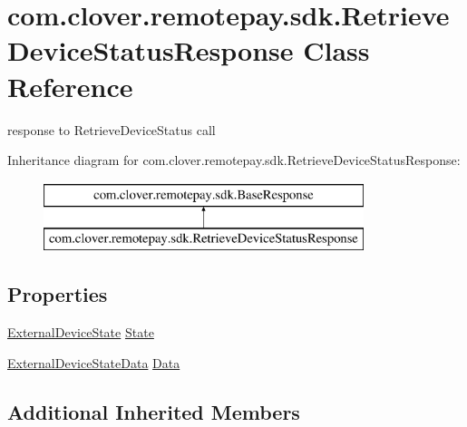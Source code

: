 \hypertarget{classcom_1_1clover_1_1remotepay_1_1sdk_1_1_retrieve_device_status_response}{}\section{com.\+clover.\+remotepay.\+sdk.\+Retrieve\+Device\+Status\+Response Class Reference}
\label{classcom_1_1clover_1_1remotepay_1_1sdk_1_1_retrieve_device_status_response}


response to Retrieve\+Device\+Status call  


Inheritance diagram for com.\+clover.\+remotepay.\+sdk.\+Retrieve\+Device\+Status\+Response\+:\begin{figure}[H]
\begin{center}
\leavevmode
\includegraphics[height=2.000000cm]{classcom_1_1clover_1_1remotepay_1_1sdk_1_1_retrieve_device_status_response}
\end{center}
\end{figure}
\subsection*{Properties}
\begin{DoxyCompactItemize}
\item 
\hyperlink{namespacecom_1_1clover_1_1remotepay_1_1sdk_a9d5838a91e2711306ad561d104fed034}{External\+Device\+State} \hyperlink{classcom_1_1clover_1_1remotepay_1_1sdk_1_1_retrieve_device_status_response_a9e4bc4a0a7fa8c32d6201d6749589212}{State}
\item 
\hyperlink{classcom_1_1clover_1_1remotepay_1_1sdk_1_1_external_device_state_data}{External\+Device\+State\+Data} \hyperlink{classcom_1_1clover_1_1remotepay_1_1sdk_1_1_retrieve_device_status_response_ade87936ceacda060e9cf0eff839feccb}{Data}
\end{DoxyCompactItemize}
\subsection*{Additional Inherited Members}


